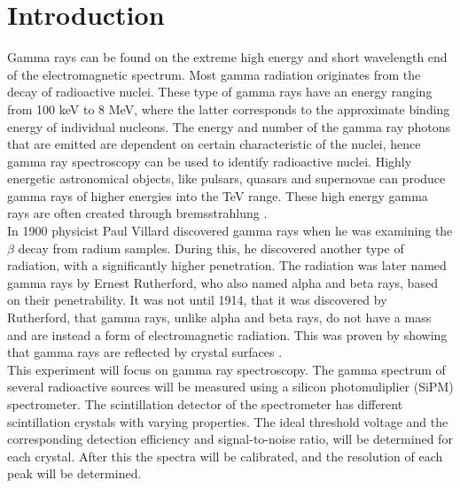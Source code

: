 \documentclass[a4paper, 11pt, table]{article}
\begin{document}
\begingroup
\hypersetup{linkcolor=black}
\setlength{\parskip}{0em}
\par
\tableofcontents
\endgroup
\newpage

\section{Introduction}

Gamma rays can be found on the extreme high energy and short wavelength end of the electromagnetic spectrum. Most gamma radiation originates from the decay of radioactive nuclei. These type of gamma rays have an energy ranging from 100 keV to 8 MeV, where the latter corresponds to the approximate binding energy of individual nucleons. The energy and number of the gamma ray photons that are emitted are dependent on certain characteristic of the nuclei, hence gamma ray spectroscopy can be used to identify radioactive nuclei. Highly energetic astronomical objects, like pulsars, quasars and supernovae can produce gamma rays of higher energies into the TeV range. These high energy gamma rays are often created through bremsstrahlung \cite{meyers_gamma-ray_2003}.\\

In 1900 physicist Paul Villard discovered gamma rays when he was examining the $\beta$ decay from radium samples. During this, he discovered another type of radiation, with a significantly higher penetration. The radiation was later named gamma rays by Ernest Rutherford, who also named alpha and beta rays, based on their penetrability. It was not until 1914, that it was discovered by Rutherford, that gamma rays, unlike alpha and beta rays, do not have a mass and are instead a form of electromagnetic radiation. This was proven by showing that gamma rays are reflected by crystal surfaces \cite{lannunziata_radioactivity_2007}.\\


This experiment will focus on gamma ray spectroscopy. The gamma spectrum of several radioactive sources will be measured using a silicon photomuliplier (SiPM) spectrometer. The scintillation detector of the spectrometer has different scintillation crystals with varying properties. The ideal threshold voltage and the corresponding detection efficiency and signal-to-noise ratio, will be determined for each crystal. After this the spectra will be calibrated, and the resolution of each peak will be determined.
\end{document}
